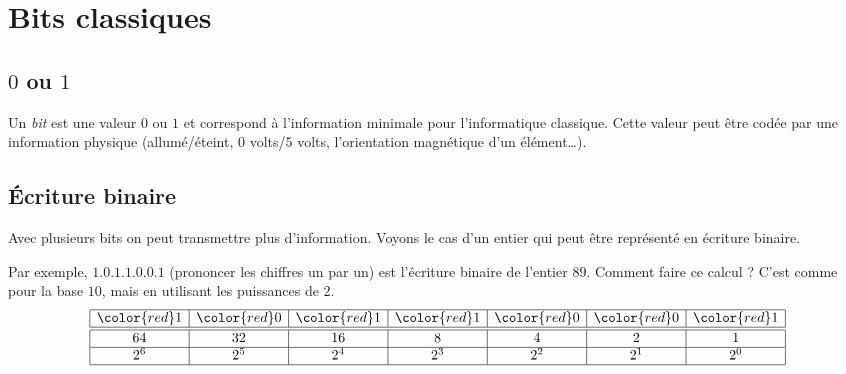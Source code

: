 \documentclass[11pt,class=report,crop=false]{standalone}
\begin{document}


\section{Bits classiques}


\subsection{$0$ ou $1$}

Un \emph{bit} est une valeur $0$ ou $1$ et correspond à l'information minimale pour l'informatique classique.
Cette valeur peut être codée par une information physique (allumé/éteint, $0$ volts/$5$ volts, l'orientation magnétique d'un élément\ldots). 

\subsection{\'Ecriture binaire}


Avec plusieurs bits on peut transmettre plus d'information.
Voyons le cas d'un entier qui peut être représenté en écriture binaire.

Par exemple, $1.0.1.1.0.0.1$ (prononcer les chiffres un par un) est l'écriture binaire de l'entier $89$. Comment faire ce calcul ? C'est comme pour la base $10$, mais en utilisant les puissances de $2$. 
$$
\begin{array}{|c|c|c|c|c|c|c|}
  \hline
  {\color{red}1} & {\color{red}0} & {\color{red}1} & {\color{red}1} & {\color{red}0} & {\color{red}0} & {\color{red}1} \\ 
  \hline\hline
  64 & 32 & 16  & 8 & 4 & 2 & 1 \\\hline
  2^6 & 2^5 & 2^4 & 2^3 & 2^2 & 2^1 & 2^0 \\
  \hline
\end{array}
$$
\end{document}
